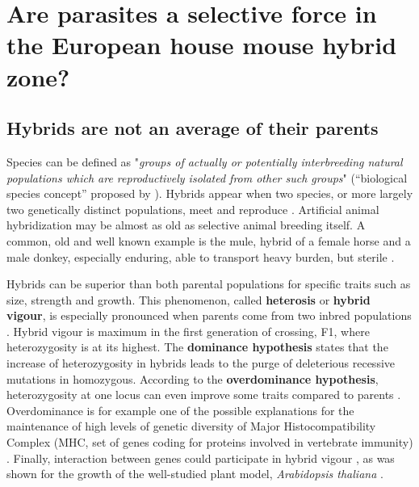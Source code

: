 \section{Are parasites a selective force in the European house mouse hybrid zone?}
\subsection{Hybrids are not an average of their parents}
Species can be defined as "\textit{groups of actually or potentially interbreeding natural populations which are reproductively isolated from other such groups}" (“biological species concept” proposed by \cite{mayr_systematics_1942}). Hybrids appear when two species, or more largely two genetically distinct populations, meet and reproduce \citep{barton_analysis_1985}. Artificial animal hybridization may be almost as old as selective animal breeding itself. A common, old and well known example is the mule, hybrid of a female horse and a male donkey, especially enduring, able to transport heavy burden, but sterile \citep{leighton_mule_1967}. 
\par
Hybrids can be superior than both parental populations for specific traits such as size, strength and growth. This phenomenon, called \textbf{heterosis} or \textbf{hybrid vigour}, is especially pronounced when parents come from two inbred populations \citep{brenner_heterosis_2001}. Hybrid vigour is maximum in the first generation of crossing, F1, where heterozygosity is at its highest. The \textbf{dominance hypothesis} states that the increase of heterozygosity in hybrids leads to the purge of deleterious recessive mutations in homozygous. According to the \textbf{overdominance hypothesis}, heterozygosity at one locus can even improve some traits compared to parents \citep{crow_overdominance_2001}. Overdominance is for example one of the possible explanations for the maintenance of high levels of genetic diversity of Major Histocompatibility Complex (MHC, set of genes coding for proteins involved in vertebrate immunity) \citep{read_major_2001, sommer_importance_2005}. Finally, interaction between genes could participate in hybrid vigour \parencite[\textbf{positive epistasis};][]{schnell_multiplicative_1992}, as was shown for the growth of the well-studied plant model, \textit{Arabidopsis thaliana} \citep{vanhaeren_combining_2014}.
\par
